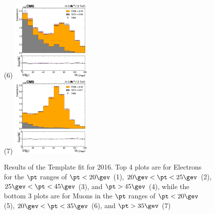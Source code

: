 \begin{figure}
  \subfigure(6) \includegraphics[width=0.35\textwidth]{template_fit/2017/mt_high_Muon_20.0.png} \\
  \subfigure(7) \includegraphics[width=0.35\textwidth]{template_fit/2017/mt_high_Muon_35.0.png}
  \caption{Results of the Template fit for 2016. Top 4 plots are for Electrons for the $\pt$ ranges of $\pt < 20\gev$ (1), $20\gev<\pt<25\gev$ (2), $25\gev<\pt<45\gev$ (3), and $\pt>45\gev$ (4), while the bottom 3 plots are for Muons in the $\pt$ ranges of $\pt < 20\gev$ (5), $20\gev<\pt<35\gev$ (6), and $\pt>35\gev$ (7)}
\end{figure}

